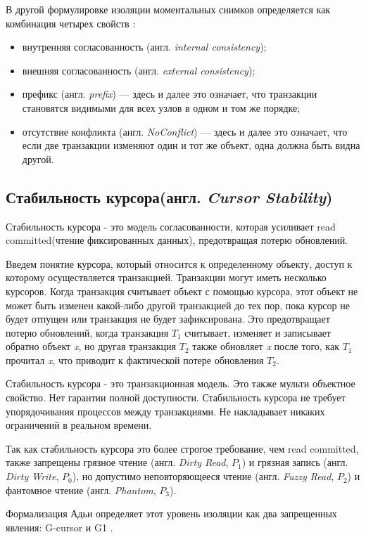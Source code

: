 \documentclass[12pt,  openany]{book}
\begin{document}
\par
В другой формулировке изоляции моментальных снимков определяется как комбинация четырех свойств  \cite{cerone_et_al}:
\begin{itemize}
\item внутренняя согласованность (англ. \textit{internal consistency});
\item внешняя согласованность (англ. \textit{external consistency});
\item префикс (англ. \textit{prefix}) --- здесь и далее это означает, что транзакции становятся видимыми для всех узлов в одном и том же порядке;
\item отсутствие конфликта (англ. \textit{NoConflict}) --- здесь и далее это означает, что если две транзакции изменяют один и тот же объект, одна должна быть видна другой.
\end{itemize}

\subsection{Стабильность курсора(англ.  \textit{Cursor Stability})}
Стабильность курсора - это модель согласованности, которая усиливает read committed(чтение фиксированных данных), предотвращая потерю обновлений.
\par
Введем понятие курсора, который относится к определенному объекту, доступ к которому осуществляется транзакцией. Транзакции могут иметь несколько курсоров. Когда транзакция считывает объект с помощью курсора, этот объект не может быть изменен какой-либо другой транзакцией до тех пор, пока курсор не будет отпущен или транзакция не будет зафиксирована.
Это предотвращает потерю обновлений, когда транзакция $T_1$ считывает, изменяет и записывает обратно объект \textit{x}, но другая транзакция $T_2$ также обновляет \textit{x} после того, как $T_1$ прочитал \textit{x}, что приводит к фактической потере обновления $T_2$.
\par
Стабильность курсора - это транзакционная модель. Это также мульти объектное свойство.
Нет гарантии полной доступности. Стабильность курсора не требует упорядочивания процессов между транзакциями. Не накладывает никаких ограничений в реальном времени.
\par
Так как стабильность курсора это более строгое требование, чем read committed, также запрещены грязное чтение (англ.  \textit{Dirty Read},  $P_1$) и грязная запись (англ. \textit{Dirty Write}, $P_0$), но допустимо неповторяющееся чтение (англ. \textit{Fuzzy Read}, $P_2$) и фантомное чтение (англ. \textit{Phantom}, $P_3$).
\par
Формализация Адьи определяет этот уровень изоляции как два запрещенных явления: G-cursor и G1  \cite{IsolationLevelDefinitions}.
\end{document}
